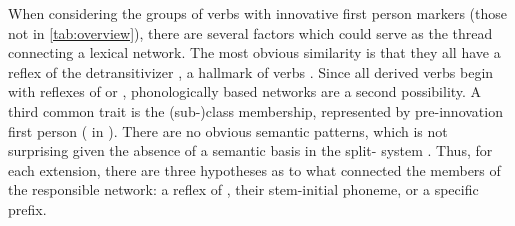 When considering the groups of verbs with innovative first person markers (those not in \cref{tab:overview}), there are several factors which could serve as the thread connecting a lexical network.
The most obvious similarity is that they all have a reflex of the detransitivizer \detrz {}, a hallmark of  verbs .
Since all derived  verbs begin with reflexes of  or  , phonologically based networks are a second possibility.
A third common trait is the  (sub-)class membership, represented by pre-innovation first person  ( in \akuriyo).
There are no obvious semantic patterns, which is not surprising given the absence of a semantic basis in the split- system .
Thus, for each extension, there are three hypotheses as to what connected the members of the responsible network: a reflex of , their stem-initial phoneme, or a specific  prefix.

